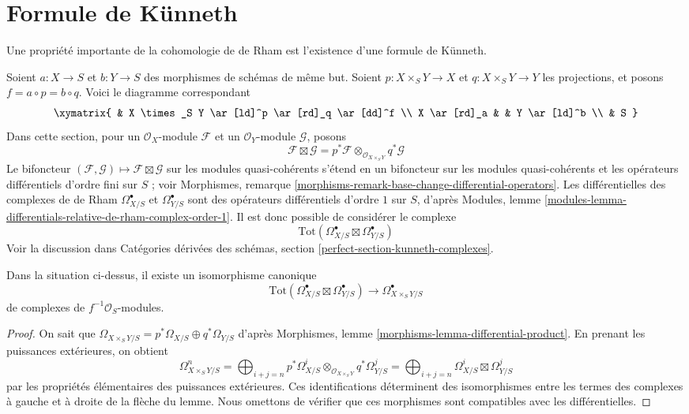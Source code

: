 \section{Formule de K\"unneth}
\label{section-kunneth}

\noindent
Une propriété importante de la cohomologie de de Rham est l'existence
d'une formule de K\"unneth.

\medskip\noindent
Soient $a : X \to S$ et $b : Y \to S$ des morphismes de schémas de même
but. Soient $p : X \times_S Y \to X$ et $q : X \times_S Y \to Y$ les
projections, et posons $f = a \circ p = b \circ q$. Voici le diagramme correspondant
$$
\xymatrix{
& X \times_S Y \ar[ld]^p \ar[rd]_q \ar[dd]^f \\
X \ar[rd]_a & & Y \ar[ld]^b \\
& S
}
$$
Dans cette section, pour un $\mathcal{O}_X$-module $\mathcal{F}$
et un $\mathcal{O}_Y$-module $\mathcal{G}$, posons
$$
\mathcal{F} \boxtimes \mathcal{G} =
p^*\mathcal{F} \otimes_{\mathcal{O}_{X \times_S Y}} q^*\mathcal{G}
$$
Le bifoncteur
$(\mathcal{F}, \mathcal{G}) \mapsto \mathcal{F} \boxtimes \mathcal{G}$
sur les modules quasi-cohérents s'étend en un bifoncteur sur les modules quasi-cohérents
et les opérateurs différentiels d'ordre fini sur $S$ ; voir
Morphismes, remarque \ref{morphisms-remark-base-change-differential-operators}.
Les différentielles des complexes de de Rham $\Omega^\bullet_{X/S}$ et
$\Omega^\bullet_{Y/S}$ sont des opérateurs différentiels d'ordre $1$
sur $S$, d'après Modules, lemme
\ref{modules-lemma-differentials-relative-de-rham-complex-order-1}.
Il est donc possible de considérer le complexe
$$
\text{Tot}(\Omega^\bullet_{X/S} \boxtimes \Omega^\bullet_{Y/S})
$$
Voir la discussion dans Catégories dérivées des schémas, section
\ref{perfect-section-kunneth-complexes}.

\begin{lemma}
\label{lemma-de-rham-complex-product}
Dans la situation ci-dessus, il existe un isomorphisme canonique
$$
\text{Tot}(\Omega^\bullet_{X/S} \boxtimes \Omega^\bullet_{Y/S})
\longrightarrow
\Omega^\bullet_{X \times_S Y/S}
$$
de complexes de $f^{-1}\mathcal{O}_S$-modules.
\end{lemma}

\begin{proof}
On sait que
$
\Omega_{X \times_S Y/S} = p^*\Omega_{X/S} \oplus q^*\Omega_{Y/S}
$
d'après Morphismes, lemme \ref{morphisms-lemma-differential-product}.
En prenant les puissances extérieures, on obtient
$$
\Omega^n_{X \times_S Y/S} =
\bigoplus\nolimits_{i + j = n}
p^*\Omega^i_{X/S} \otimes_{\mathcal{O}_{X \times_S Y}} q^*\Omega^j_{Y/S} =
\bigoplus\nolimits_{i + j = n}
\Omega^i_{X/S} \boxtimes \Omega^j_{Y/S}
$$
par les propriétés élémentaires des puissances extérieures. Ces identifications déterminent
des isomorphismes entre les termes des complexes à gauche et à droite
de la flèche du lemme. Nous omettons de vérifier que ces morphismes
sont compatibles avec les différentielles.
\end{proof}

